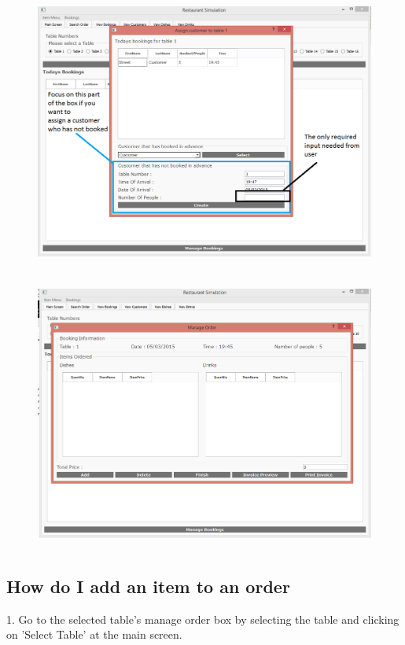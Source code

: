 \begin{figure}[H]
    \includegraphics[height = 9cm]{./Manual/images/AssignCust2} 
    \caption{} \label{fig:assigncust2}
\end{figure}

\begin{figure}[H]
    \includegraphics[height = 9cm]{./Manual/images/base/ManageOrder} 
    \caption{} \label{fig:assigncust3}
\end{figure}

\subsection{How do I add an item to an order}

1. Go to the selected table's manage order box by selecting the table and clicking on 'Select Table' at the main screen.

